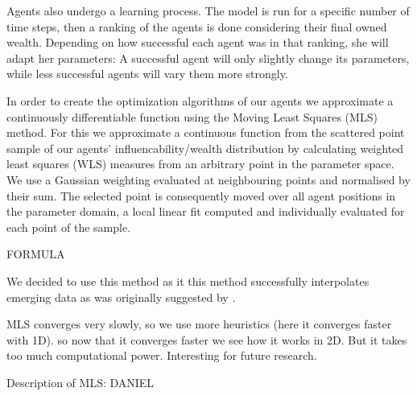 \documentclass[11pt]{article}
\begin{document}
Agents also undergo a learning process. The model is run for a specific number of time steps, then a ranking of the agents is done considering their final owned wealth. Depending on how successful each agent was in that ranking, she will adapt her parameters: A successful agent will only slightly change its parameters, while less successful agents will vary them more strongly.

In order to create the optimization algorithms of our agents we approximate a continuously differentiable function using the Moving Least Squares (MLS) method. For this we approximate a continuous function from the scattered point sample of our agents’ influencability/wealth distribution by calculating weighted least squares (WLS) measures from an arbitrary point in the parameter space. We use a Gaussian weighting evaluated at neighbouring points and normalised by their sum. The selected point is consequently moved over all agent positions in the parameter domain, a local linear fit computed and individually evaluated for each point of the sample. 

FORMULA

We decided to use this method as it this method successfully interpolates emerging data 
as was originally suggested by \citet{lancaster1981surfaces}. 

MLS converges very slowly, so we use more heuristics (here it converges faster with 1D). so now that it converges faster we see how it works in 2D. But it takes too much computational power. Interesting for future research. 







Description of MLS: DANIEL
\end{document}
